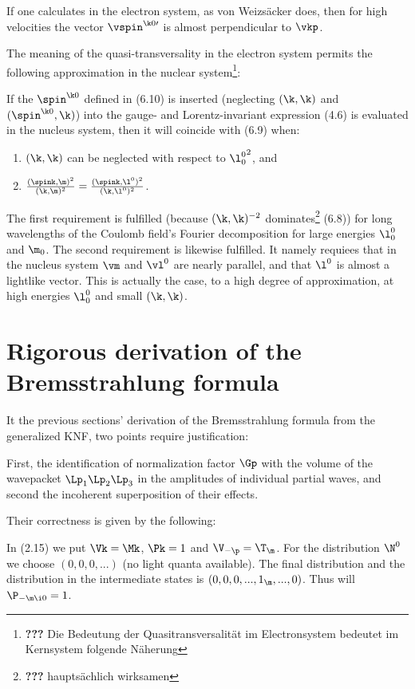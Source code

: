 \documentclass{article}
\newcommand{\WTF}[1]{\footnote{\textbf{???} #1}}
\begin{document}
If one calculates in the electron system, as von Weizsäcker does, then for high velocities the vector ${\vspin}^{\k 0 \prime}$ is almost perpendicular to $\vkp$.

The meaning of the quasi-transversality in the electron system permits the following approximation in the nuclear system\WTF{Die Bedeutung der Quasitransversalität im Electronsystem bedeutet im Kernsystem folgende Näherung}:

If the $\spin^{\k 0}$ defined in (6.10) is inserted (neglecting $(\k,\k)$ and $(\spin^{\k 0}, \k)$) into the gauge- and Lorentz-invariant expression (4.6) is evaluated in the nucleus system, then it will coincide with (6.9) when:
\begin{enumerate}
  \item $(\k,\k)$ can be neglected with respect to ${\l^0_0}^2$, and
  \item $\frac{(\spink,\m)^2}{(\k,\m)^2} = \frac{(\spink,\l^0)^2}{(\k,\l^0)^2}$.
\end{enumerate}
The first requirement is fulfilled (because $(\k,\k)^{-2}$ dominates\WTF{hauptsächlich wirksamen} (6.8)) for long wavelengths of the Coulomb field's Fourier decomposition for large energies $\l^0_0$ and $\m_0$. The second requirement is likewise fulfilled. It namely requiees that in the nucleus system $\vm$ and $\vl^0$ are nearly parallel, and that $\l^0$ is almost a lightlike vector. This is actually the case, to a high degree of approximation, at high energies $\l^0_0$ and small $(\k,\k)$.

\section{Rigorous derivation of the Bremsstrahlung formula}

It the previous sections' derivation of the Bremsstrahlung formula from the generalized KNF, two points require justification:

First, the identification of normalization factor $\Gp$ with the volume of the wavepacket $\Lp_1\Lp_2\Lp_3$ in the amplitudes of individual partial waves,
and second the incoherent superposition of their effects.

Their correctness is given by the following:

In (2.15) we put $\Vk=\Mk$, $\Pk=1$ and $\V_{-\p} = \T_\m$. For the distribution $\N^0$ we choose $(0,0,0,...)$ (no light quanta available). The final distribution and the distribution in the intermediate states is $(0,0,0, ..., 1_\m, ..., 0)$. Thus will $\P_{-\m\i 0}=1$.
\end{document}
